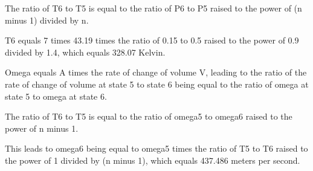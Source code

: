 The ratio of T6 to T5 is equal to the ratio of P6 to P5 raised to the power of (n minus 1) divided by n.

T6 equals 7 times 43.19 times the ratio of 0.15 to 0.5 raised to the power of 0.9 divided by 1.4, which equals 328.07 Kelvin.

Omega equals A times the rate of change of volume V, leading to the ratio of the rate of change of volume at state 5 to state 6 being equal to the ratio of omega at state 5 to omega at state 6.

The ratio of T6 to T5 is equal to the ratio of omega5 to omega6 raised to the power of n minus 1.

This leads to omega6 being equal to omega5 times the ratio of T5 to T6 raised to the power of 1 divided by (n minus 1), which equals 437.486 meters per second.